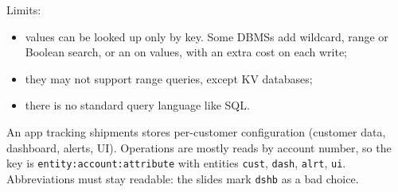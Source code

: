 Limits:
\begin{itemize}
  \item values can be looked up only by key. Some DBMSs add wildcard, range or Boolean search, or an  on values, with an extra cost on each write;
  \item they may not support range queries, except  KV databases;
  \item there is no standard query language like SQL.
\end{itemize}

\begin{example}
An app tracking shipments stores per-customer configuration (customer data, dashboard, alerts, UI). Operations are mostly reads by account number, so the key is \texttt{entity:account:attribute} with entities \texttt{cust}, \texttt{dash}, \texttt{alrt}, \texttt{ui}. Abbreviations must stay readable: the slides mark \texttt{dshb} as a bad choice.
\end{example}
